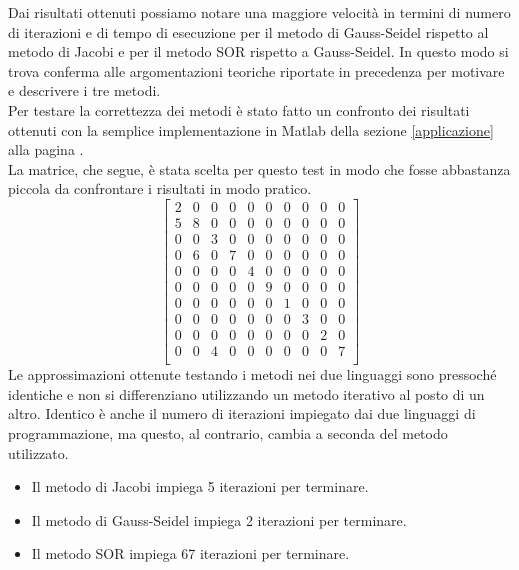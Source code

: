 \documentclass[12pt]{article}
\begin{document}
Dai risultati ottenuti possiamo notare una maggiore velocità in termini di numero di iterazioni e di tempo di esecuzione per il metodo di Gauss-Seidel rispetto al metodo di Jacobi e per il metodo SOR rispetto a Gauss-Seidel. In questo modo si trova conferma alle argomentazioni teoriche riportate in precedenza per motivare e descrivere i tre metodi.\\
Per testare la correttezza dei metodi è stato fatto un confronto dei risultati ottenuti con la semplice implementazione in Matlab della sezione \ref{applicazione} alla pagina \pageref{applicazione}. \\La matrice, che segue, è stata scelta per questo test in modo che fosse abbastanza piccola da confrontare i risultati in modo pratico.
\begin{equation*}
   \left[
    \begin{matrix}
        2 & 0 & 0 & 0 & 0 & 0 & 0 & 0 & 0 & 0 \\
        5 & 8 & 0 & 0 & 0 & 0 & 0 & 0 & 0 & 0 \\
        0 & 0 & 3 & 0 & 0 & 0 & 0 & 0 & 0 & 0 \\
        0 & 6 & 0 & 7 & 0 & 0 & 0 & 0 & 0 & 0 \\ 
        0 & 0 & 0 & 0 & 4 & 0 & 0 & 0 & 0 & 0 \\
        0 & 0 & 0 & 0 & 0 & 9 & 0 & 0 & 0 & 0 \\
        0 & 0 & 0 & 0 & 0 & 0 & 1 & 0 & 0 & 0 \\
        0 & 0 & 0 & 0 & 0 & 0 & 0 & 3 & 0 & 0 \\
        0 & 0 & 0 & 0 & 0 & 0 & 0 & 0 & 2 & 0 \\
        0 & 0 & 4 & 0 & 0 & 0 & 0 & 0 & 0 & 7 \\
    \end{matrix}
    \right]
\end{equation*}
Le approssimazioni ottenute testando i metodi nei due linguaggi sono pressoché identiche e non si differenziano utilizzando un metodo iterativo al posto di un altro. Identico è anche il numero di iterazioni impiegato dai due linguaggi di programmazione, ma questo, al contrario, cambia a seconda del metodo utilizzato. 
\begin{itemize}
    \item Il metodo di Jacobi impiega 5 iterazioni per terminare.
    \item Il metodo di Gauss-Seidel impiega 2 iterazioni per terminare.
    \item Il metodo SOR impiega 67 iterazioni per terminare.
\end{itemize}
\end{document}
